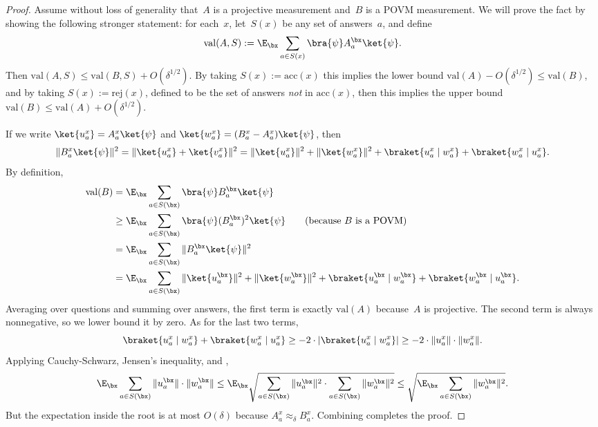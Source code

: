 \begin{proof}
Assume without loss of generality that~$A$ is a projective measurement and~$B$ is a POVM measurement.
We will prove the fact by showing the following stronger statement:
for each~$x$, let~$S(x)$ be any set of answers~$a$,
and define
\begin{equation*}
\mathrm{val}(A,S) := \E_\bx \sum_{a \in S(x)} \bra{\psi} A^{\bx}_a\ket{\psi}.
\end{equation*}
Then $\mathrm{val}(A,S) \leq \mathrm{val}(B,S) + O(\delta^{1/2})$.
By taking $S(x) := \mathrm{acc}(x)$ this implies the lower bound $\mathrm{val}(A) - O(\delta^{1/2}) \leq \mathrm{val}(B)$,
and by taking $S(x) := \mathrm{rej}(x)$, defined to be the set of answers \emph{not} in $\mathrm{acc}(x)$,
then this implies the upper bound $\mathrm{val}(B) \leq \mathrm{val}(A) + O(\delta^{1/2})$.

If we write $\ket{u_a^x} = A_{a}^{x}  \ket{\psi}$
	and $\ket{w_a^x} = (B_{a}^{x} - A_{a}^{x}) \ket{\psi}$, then
\begin{equation*}
\Vert B_{a}^{x} \ket{\psi} \Vert^2
= \Vert \ket{u_a^x} + \ket{v_a^x} \Vert^2
 = \Vert\ket{u_a^x}\Vert^2 + \Vert\ket{w_a^x}\Vert^2
 + \braket{u_a^x \mid w_a^x} + \braket{w_a^x \mid u_a^x}.
\end{equation*}
By definition,
\begin{align*}
\mathrm{val}(B)
& = \E_{\bx} \sum_{a\in S(\bx)} \bra{\psi} B_{a}^{\bx} \ket{\psi}\\
& \geq \E_{\bx} \sum_{a\in S(\bx)} \bra{\psi} (B_{a}^{\bx})^2 \ket{\psi}\tag{because~$B$ is a POVM}\\
& = \E_{\bx} \sum_{a\in S(\bx)}\Vert B_{a}^{\bx} \ket{\psi} \Vert^2\\
& = \E_{\bx} \sum_{a\in S(\bx)} \Vert\ket{u_a^{\bx}}\Vert^2 + \Vert\ket{w_a^{\bx}}\Vert^2
		 + \braket{u_a^{\bx} \mid w_a^{\bx}} + \braket{w_a^{\bx} \mid u_a^{\bx}}.
\end{align*}
Averaging over questions and summing over answers, the first term is exactly $\mathrm{val}(A)$ because~$A$ is projective.
The second term is always nonnegative, so we lower bound it by zero.
As for the last two terms,
\begin{equation}\label{eq:our-powers-combined--wind!}
\braket{u_a^x \mid w_a^x} + \braket{w_a^x \mid u_a^x}
\geq - 2 \cdot |\braket{u_a^x \mid w_a^x}| 
\geq -2 \cdot \Vert u_a^x \Vert \cdot \Vert w_a^x \Vert.
\end{equation}
Applying Cauchy-Schwarz,
Jensen's inequality,
and ,
\begin{equation}\label{eq:our-powers-combined--heart!}
\E_{\bx} \sum_{a \in S(\bx)} \Vert u_a^{\bx} \Vert \cdot \Vert w_a^{\bx} \Vert
\leq \E_{\bx} \sqrt{\sum_{a \in S(\bx)} \Vert u_a^{\bx} \Vert^2 \cdot  \sum_{a \in S(\bx)}\Vert w_a^{\bx}\Vert^2 }
\leq \sqrt{\E_{\bx} \sum_{a \in S(\bx)}\Vert w_a^{\bx}\Vert^2 }.
\end{equation}
But the expectation inside the root is at most $O(\delta)$ because $A^{x}_a \approx_{\delta} B^{x}_a$.
Combining  completes the proof.
\end{proof}

